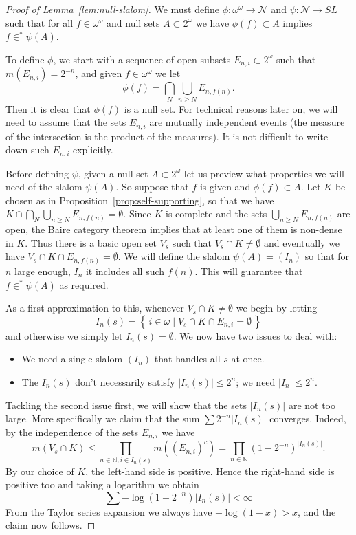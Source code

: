 \documentclass[11pt,oneside]{amsbook}
\newcommand{\set}[1]{\left\{\,#1\,\right\}}
\newcommand{\NN}{\mathbb N}
\newcommand{\Null}{\mathcal N}
\theoremstyle{definition}
\theoremstyle{plain}
\theoremstyle{definition}
\theoremstyle{remark}
\numberwithin{equation}{section}
\numberwithin{figure}{section}
\begin{document}
\begin{proof}[Proof of Lemma~\ref{lem:null-slalom}]
  We must define $\phi\colon\omega^\omega\to\Null$ and $\psi\colon\Null\to SL$ such that for all $f\in\omega^\omega$ and null sets $A\subset2^\omega$ we have $\phi(f)\subset A$ implies $f\in^*\psi(A)$.

  To define $\phi$, we start with a sequence of open subsets $E_{n,i}\subset2^\omega$ such that $m(E_{n,i})=2^{-n}$, and given $f\in\omega^\omega$ we let
  \[\phi(f)=\bigcap_N\bigcup_{n\geq N} E_{n,f(n)}\text{.}
  \]
  Then it is clear that $\phi(f)$ is a null set. For technical reasons later on, we will need to assume that the sets $E_{n,i}$ are mutually independent events (the measure of the intersection is the product of the measures). It is not difficult to write down such $E_{n,i}$ explicitly.

  Before defining $\psi$, given a null set $A\subset2^\omega$ let us preview what properties we will need of the slalom $\psi(A)$. So suppose that $f$ is given and $\phi(f)\subset A$. Let $K$ be chosen as in Proposition~\ref{prop:self-supporting}, so that we have $K\cap\bigcap_N\bigcup_{n\geq N}E_{n,f(n)}=\emptyset$. Since $K$ is complete and the sets $\bigcup_{n\geq N}E_{n,f(n)}$ are open, the Baire category theorem implies that at least one of them is non-dense in $K$. Thus there is a basic open set $V_s$ such that $V_s\cap K\neq\emptyset$ and eventually we have $V_s\cap K\cap E_{n,f(n)}=\emptyset$. We will define the slalom $\psi(A)=(I_n)$ so that for $n$ large enough, $I_n$ it includes all such $f(n)$. This will guarantee that $f\in^*\psi(A)$ as required.

  As a first approximation to this, whenever $V_s\cap K\neq\emptyset$ we begin by letting
  \[I_n(s)=\set{i\in\omega\mid V_s\cap K\cap E_{n,i}=\emptyset}
  \]
  and otherwise we simply let $I_n(s)=\emptyset$. We now have two issues to deal with:
  \begin{itemize}
  \item We need a single slalom $(I_n)$ that handles all $s$ at once.
  \item The $I_n(s)$ don't necessarily satisfy $|I_n(s)|\leq2^n$; we need $|I_n|\leq2^n$.
  \end{itemize}

  Tackling the second issue first, we will show that the sets $|I_n(s)|$ are not too large. More specifically we claim that the sum $\sum2^{-n}|I_n(s)|$ converges. Indeed, by the independence of the sets $E_{n,i}$ we have
  \[m(V_s\cap K)\leq\prod_{n\in\NN,i\in I_n(s)}m((E_{n,i})^c)
  =\prod_{n\in\NN}(1-2^{-n})^{|I_n(s)|}\text{.}
  \]
  By our choice of $K$, the left-hand side is positive. Hence the right-hand side is positive too and taking a logarithm we obtain
  \[\sum-\log(1-2^{-n})|I_n(s)|<\infty
  \]
  From the Taylor series expansion we always have $-\log(1-x)>x$, and the claim now follows.


\end{proof}
\end{document}
